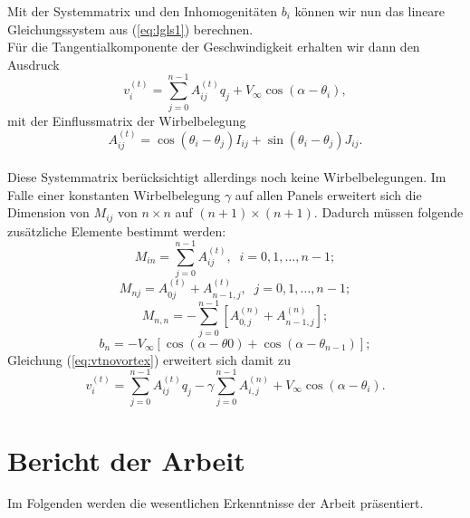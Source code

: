 Mit der Systemmatrix und den Inhomogenitäten $b_i$ können wir nun das lineare Gleichungssystem aus (\ref{eq:lgls1}) berechnen. \\
Für die Tangentialkomponente der Geschwindigkeit erhalten wir dann den Ausdruck
\begin{equation}
\label{eq:vtnovortex}
v_i^{(t)} =  \sum_{j=0}^{n-1} A_{ij}^{(t)} q_j + V_{\infty} \cos{(\alpha - \theta_i)},
\end{equation}
mit der Einflussmatrix der Wirbelbelegung
\begin{equation}
A_{ij}^{(t)} =  \cos{(\theta _i - \theta _j)} I_{ij} + \sin{(\theta _i - \theta _j)} J_{ij}.
\end{equation}
\\
Diese Systemmatrix berücksichtigt allerdings noch keine Wirbelbelegungen. Im Falle einer konstanten Wirbelbelegung $\gamma$ auf allen Panels erweitert sich die Dimension von $M_{ij}$ von $n \times n$ auf $(n+1) \times (n+1)$. Dadurch müssen folgende zusätzliche Elemente bestimmt werden:
\begin{equation}
M_{in} =  \sum_{j=0}^{n-1} A_{ij}^{(t)}, \;\; i=0,1,\ldots, n-1;
\end{equation}
\begin{equation}
M_{nj} =  A_{0j}^{(t)} + A_{n-1,j}^{(t)}, \;\; j =0,1,\ldots, n-1;
\end{equation}
\begin{equation}
M_{n,n} =  - \sum_{j=0}^{n-1} \left[ A_{0,j}^{(n)} + A_{n-1,j}^{(n)}\right];
\end{equation}
\begin{equation}
b_n =  -V_{\infty} [\cos{(\alpha -\theta 0)} + \cos{(\alpha -\theta _{n-1})}];
\end{equation}
Gleichung (\ref{eq:vtnovortex}) erweitert sich damit zu
\begin{equation}
v_i^{(t)} =  \sum_{j=0}^{n-1} A_{ij}^{(t)} q_j - \gamma \sum_{j=0}^{n-1}A_{i,j}^{(n)} + V_{\infty} \cos{(\alpha - \theta_i)}.
\end{equation}
\newpage
\chapter{Bericht der Arbeit}
Im Folgenden werden die wesentlichen Erkenntnisse der Arbeit präsentiert.
